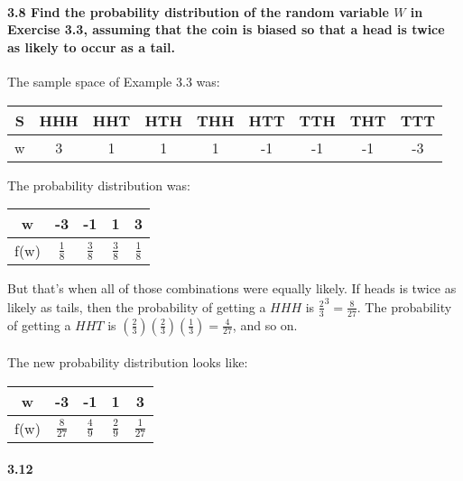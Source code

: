 \documentclass{article}
\begin{document}
\paragraph{3.8 Find the probability distribution of the random variable 
$W$ in Exercise 3.3, assuming that the coin is biased so that a head is 
twice as likely to occur as a tail.\\}
The sample space of Example 3.3 was:
\begin{center}
\begin{tabular}{c|c c c c c c c c}
S & HHH & HHT & HTH & THH & HTT & TTH & THT & TTT\\
\hline
w &  3  &  1  &  1  &  1  &  -1 &  -1 &  -1 &  -3
\end{tabular}
\end{center}
The probability distribution was:
\begin{center}
\begin{tabular}{c|c c c c}
w    &  -3         & -1          & 1           & 3\\
\hline
f(w) & $\frac{1}{8}$ & $\frac{3}{8}$ & $\frac{3}{8}$ & $\frac{1}{8}$
\end{tabular}
\end{center}
But that's when all of those combinations were equally likely.
If heads is twice as likely as tails, then the probability of getting
a $HHH$ is $\frac{2}{3}^3 = \frac{8}{27}$. The probability of getting
a $HHT$ is $\left(\frac{2}{3}\right)\left(\frac{2}{3}\right)
  \left(\frac{1}{3}\right) = \frac{4}{27}$, and so on.\\
\\
The new
probability distribution looks like:
\begin{center}
\begin{tabular}{|c|c c c c|}
\hline
w    &  -3         & -1          & 1           & 3\\
\hline
f(w) & $\frac{8}{27}$ & $\frac{4}{9}$ & $\frac{2}{9}$ & $\frac{1}{27}$\\
\hline
\end{tabular}
\end{center}

\paragraph{3.12 }
\end{document}
